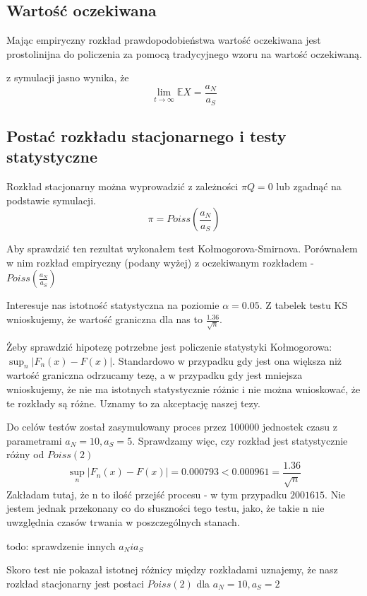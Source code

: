 \documentclass{article}
\begin{document}
\subsection{Wartość oczekiwana}

Mając empiryczny rozkład prawdopodobieństwa wartość oczekiwana jest prostolinijna do policzenia za pomocą tradycyjnego wzoru na wartość oczekiwaną.

z symulacji jasno wynika, że \[\lim_{t\rightarrow \infty}\mathbb{E}X = \frac{a_N}{a_S}\]
\subsection{Postać rozkładu stacjonarnego i testy statystyczne}
Rozkład stacjonarny można wyprowadzić z zależności $\pi  Q = 0$ lub zgadnąć na podstawie symulacji. 
\[\pi = Poiss(\frac{a_N}{a_S})\]

Aby sprawdzić ten rezultat wykonałem test Kołmogorova-Smirnova. Porównałem w nim rozkład empiryczny (podany wyżej) z oczekiwanym rozkładem - $Poiss(\frac{a_N}{a_S})$

Interesuje nas istotność statystyczna na poziomie $\alpha = 0.05$. Z tabelek testu KS wnioskujemy, że wartość graniczna dla nas to $\frac{1.36}{\sqrt{n}}$. 

Żeby sprawdzić hipotezę potrzebne jest policzenie statystyki Kołmogorowa: $\sup_n |F_n(x) - F(x)| $. Standardowo w przypadku gdy jest ona większa niż wartość graniczna odrzucamy tezę, a w przypadku gdy jest mniejsza wnioskujemy, że nie ma istotnych statystycznie różnic i nie można wnioskować, że te rozkłady są różne. Uznamy to za akceptację naszej tezy.

Do celów testów został zasymulowany proces przez 100000 jednostek czasu z parametrami $a_N = 10, a_S = 5$. 
Sprawdzamy więc, czy rozkład jest statystycznie różny od $Poiss(2)$
 \[\sup_n |F_n(x) - F(x)| = 0.000793 < 0.000961 = \frac{1.36}{\sqrt{n}}\]
Zakładam tutaj, że n to ilość przejść procesu - w tym przypadku $2001615$. Nie jestem jednak przekonany co do słuszności tego testu, jako, że takie n nie uwzględnia czasów trwania w poszczególnych stanach.

todo: sprawdzenie innych $a_N i a_S$

Skoro test nie pokazał istotnej różnicy między rozkładami uznajemy, że nasz rozkład stacjonarny jest postaci $Poiss(2)$ dla $a_N = 10, a_S = 2$
\end{document}
